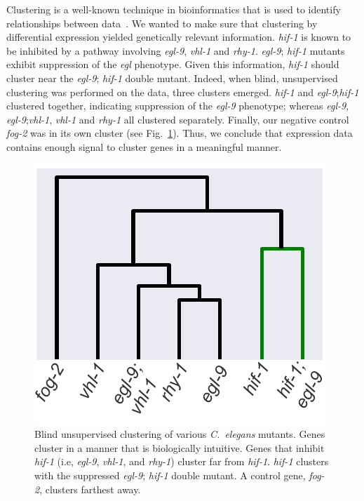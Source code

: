 \documentclass[9pt,twocolumn,twoside]{pnas-new}
\newcommand{\cel}{\emph{C.~elegans}}
\newcommand{\egl}{\emph{egl-9}}
\newcommand{\rhy}{\emph{rhy-1}}
\newcommand{\vhl}{\emph{vhl-1}}
\newcommand{\hif}{\emph{hif-1}}
\newcommand{\fog}{\emph{fog-2}}
\begin{document}
Clustering is a well-known technique in bioinformatics that is used to identify relationships between data~\cite{Yeung2003}. We wanted to make sure that clustering by differential expression yielded genetically relevant information. \hif{} is known to be inhibited by a pathway involving \egl{}, \vhl{} and \rhy{}. \egl{}; \hif{} mutants exhibit suppression of the \emph{egl} phenotype. Given this information, \hif{} should cluster near the \egl{}; \hif{} double mutant.
Indeed, when blind, unsupervised clustering was performed on the data, three clusters emerged. \hif{} and \egl{};\hif{} clustered together, indicating suppression of the \egl{} phenotype; whereas \egl{}, \egl{};\vhl{}, \vhl{} and \rhy{} all clustered separately. Finally, our negative control \fog{} was in its own cluster (see Fig.~\ref{fig:dendrogram}). Thus, we conclude that expression data contains enough signal to cluster genes in a meaningful manner.

\begin{figure}%
\centering
\includegraphics[width=\linewidth]{figs/dendrogram.pdf}
\caption{Blind unsupervised clustering of various \cel{} mutants. Genes cluster in a manner that is biologically intuitive. Genes that inhibit \hif{} (i.e, \egl{}, \vhl{}, and \rhy{}) cluster far from \hif{}. \hif{} clusters with the suppressed \egl{}; \hif{} double mutant. A control gene, \fog{}, clusters farthest away.}
\label{fig:dendrogram}
\end{figure}
\end{document}
